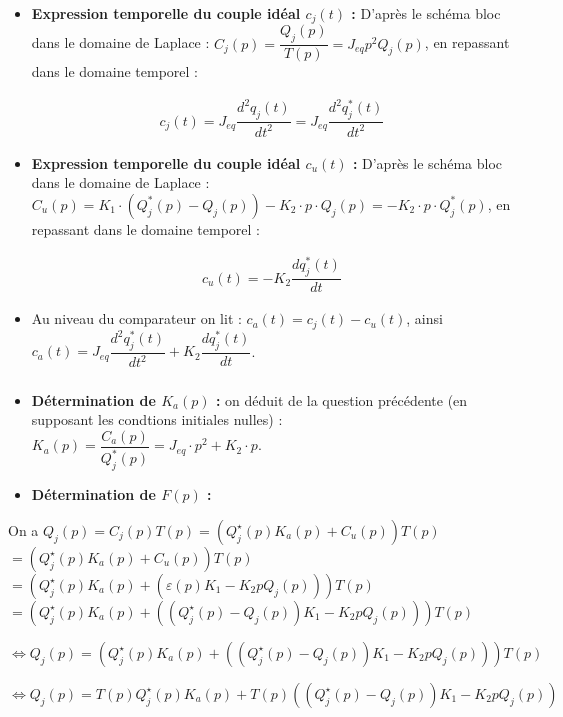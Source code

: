 \documentclass[10pt,fleqn]{article} %
\begin{document}
\begin{itemize}
\item \textbf{Expression temporelle du couple idéal $c_j(t)$ : }
D'après le schéma bloc dans le domaine de Laplace : $C_j(p)=\dfrac{Q_j(p)}{T(p)}=J_{eq}p^2Q_j(p)$, en repassant dans le domaine temporel : 

\begin{align*}
c_j(t)=J_{eq}\dfrac{d^2q_j(t)}{dt^2}=J_{eq}\dfrac{d^2q^*_j(t)}{dt^2}
\end{align*}
\item \textbf{Expression temporelle du couple idéal $c_u(t)$ : }
D'après le schéma bloc dans le domaine de Laplace : $C_u(p)=K_1\cdot (Q^*_j(p)-Q_j(p))-K_2\cdot p\cdot Q_j(p)=-K_2\cdot p\cdot Q^*_j(p)$, en repassant dans le domaine temporel : 

\begin{align*}
c_u(t)=-K_{2}\dfrac{dq^*_j(t)}{dt}
\end{align*}
\item Au niveau du comparateur on lit : $c_a(t)=c_j(t)-c_u(t)$, ainsi $c_a(t)=J_{eq}\dfrac{d^2q^*_j(t)}{dt^2}+K_{2}\dfrac{dq^*_j(t)}{dt}$.
\end{itemize}
\subparagraph{}\textit{}%


\begin{itemize}
\item \textbf{Détermination de $K_a(p)$ :} on déduit de la question précédente (en supposant les condtions initiales nulles) : $K_a(p)=\dfrac{C_a(p)}{Q^*_j(p)}=J_{eq}\cdot p^2+K_2\cdot p$.
\item \textbf{Détermination de $F(p)$ :}
\end{itemize}

On a $Q_j(p) = C_j(p) T(p)= \left( Q_j^{\star}(p) K_a(p) + C_u(p) \right) T(p)$
$= \left( Q_j^{\star}(p) K_a(p) + C_u(p) \right) T(p)$
$= \left( Q_j^{\star}(p) K_a(p) + \left( \varepsilon(p) K_1 - K_2 p Q_j(p) \right)\right) T(p)$
$= \left( Q_j^{\star}(p) K_a(p) + \left( \left(Q_j^{\star}(p) - Q_j(p) \right) K_1 - K_2 p Q_j(p) \right)\right) T(p)$


$\Leftrightarrow Q_j(p) = 
\left(
    Q_j^{\star}(p) K_a(p) + 
    \left( 
        \left(Q_j^{\star}(p) - Q_j(p) \right) K_1 - K_2 p Q_j(p) 
    \right)
\right) T(p)$

$\Leftrightarrow Q_j(p) = 
    T(p)Q_j^{\star}(p) K_a(p) + 
    T(p)\left( 
        \left(Q_j^{\star}(p) - Q_j(p) \right) K_1 - K_2 p Q_j(p) 
    \right) $
\end{document}
